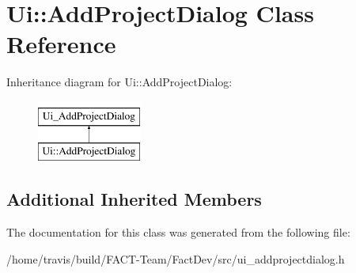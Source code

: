 \hypertarget{classUi_1_1AddProjectDialog}{\section{Ui\-:\-:Add\-Project\-Dialog Class Reference}
\label{classUi_1_1AddProjectDialog}
}
Inheritance diagram for Ui\-:\-:Add\-Project\-Dialog\-:\begin{figure}[H]
\begin{center}
\leavevmode
\includegraphics[height=2.000000cm]{d9/d0a/classUi_1_1AddProjectDialog}
\end{center}
\end{figure}
\subsection*{Additional Inherited Members}


The documentation for this class was generated from the following file\-:\begin{DoxyCompactItemize}
\item 
/home/travis/build/\-F\-A\-C\-T-\/\-Team/\-Fact\-Dev/src/ui\-\_\-addprojectdialog.\-h\end{DoxyCompactItemize}
